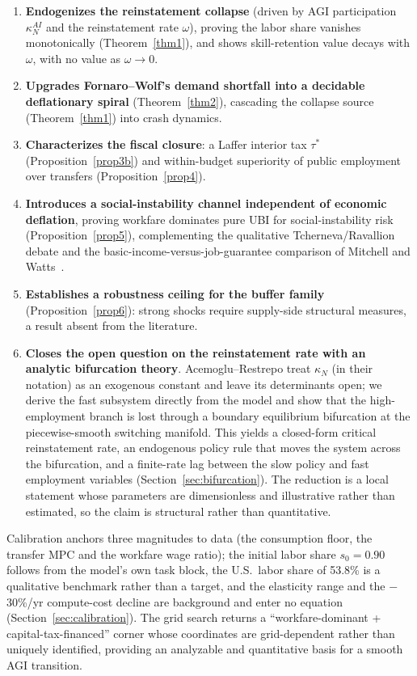 \documentclass[review,12pt]{elsarticle}
\theoremstyle{plain}
\theoremstyle{definition}
\theoremstyle{remark}
\begin{document}
\begin{enumerate}
\item \textbf{Endogenizes the reinstatement collapse} (driven by AGI participation $\kappa_N^{AI}$ and the reinstatement rate $\omega$), proving the labor share vanishes monotonically (Theorem~\ref{thm1}), and shows skill-retention value decays with $\omega$, with no value as $\omega\to0$.
\item \textbf{Upgrades Fornaro--Wolf's demand shortfall into a decidable deflationary spiral} (Theorem~\ref{thm2}), cascading the collapse source (Theorem~\ref{thm1}) into crash dynamics.
\item \textbf{Characterizes the fiscal closure}: a Laffer interior tax $\tau^*$ (Proposition~\ref{prop3b}) and within-budget superiority of public employment over transfers (Proposition~\ref{prop4}).
\item \textbf{Introduces a social-instability channel independent of economic deflation}, proving workfare dominates pure UBI for social-instability risk (Proposition~\ref{prop5}), complementing the qualitative Tcherneva/Ravallion debate and the basic-income-versus-job-guarantee comparison of Mitchell and Watts~\cite{Tcherneva,Ravallion,MitchellWatts2004}.
\item \textbf{Establishes a robustness ceiling for the buffer family} (Proposition~\ref{prop6}): strong shocks require supply-side structural measures, a result absent from the literature.
\item \textbf{Closes the open question on the reinstatement rate with an analytic bifurcation theory}. Acemoglu--Restrepo treat $\kappa_N$ (in their notation) as an exogenous constant and leave its determinants open; we derive the fast subsystem directly from the model and show that the high-employment branch is lost through a boundary equilibrium bifurcation at the piecewise-smooth switching manifold. This yields a closed-form critical reinstatement rate, an endogenous policy rule that moves the system across the bifurcation, and a finite-rate lag between the slow policy and fast employment variables (Section~\ref{sec:bifurcation}). The reduction is a local statement whose parameters are dimensionless and illustrative rather than estimated, so the claim is structural rather than quantitative.
\end{enumerate}

Calibration anchors three magnitudes to data (the consumption floor, the transfer MPC and the workfare wage ratio); the initial labor share $s_0=0.90$ follows from the model's own task block, the U.S.\ labor share of 53.8\% is a qualitative benchmark rather than a target, and the elasticity range and the $-$30\%/yr compute-cost decline are background and enter no equation (Section~\ref{sec:calibration}). The grid search returns a ``workfare-dominant + capital-tax-financed'' corner whose coordinates are grid-dependent rather than uniquely identified, providing an analyzable and quantitative basis for a smooth AGI transition.
\end{document}
